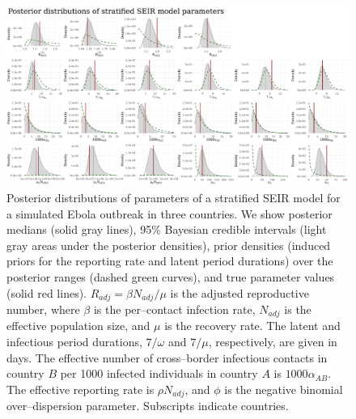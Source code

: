 \begin{figure}
	\begin{fullpage}
		\centering
		\includegraphics[width=\linewidth]{figures/ebola_synth_posts}
		\caption[Posterior distributions of stratified SEIR model parameters for a simulated Ebola outbreak in three countries.]{Posterior distributions of parameters of a stratified SEIR model for a simulated Ebola outbreak in three countries. We show posterior medians (solid gray lines), 95\% Bayesian credible intervals (light gray areas under the posterior densities), prior densities (induced priors for the reporting rate and latent period durations) over the posterior ranges (dashed green curves), and true parameter values (solid red lines). $ R_{adj} = \beta N_{adj}/\mu $ is the adjusted reproductive number, where $ \beta $ is the per--contact infection rate, $ N_{adj} $ is the effective population size, and $ \mu $ is the recovery rate. The latent and infectious period durations, $ 7/\omega $ and $ 7/\mu $, respectively, are given in days. The effective number of cross--border infectious contacts in country $ B $ per 1000 infected individuals in country $ A $ is $ 1000\alpha_{AB} $. The effective reporting rate is $ \rho N_{adj} $, and $ \phi $ is the negative binomial over--dispersion parameter. Subscripts indicate countries.}
		\label{fig:ebola_synth_posts}
	\end{fullpage}
\end{figure}

